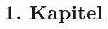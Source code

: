 \documentclass{cheatsheet}
\author{Noa Sendlhofer \& Christian Leser \\ nsendlhofer \& cleser \\ \vspace*{-0.2em}}
\begin{document}
\section{1. Kapitel}
	
\end{document}
